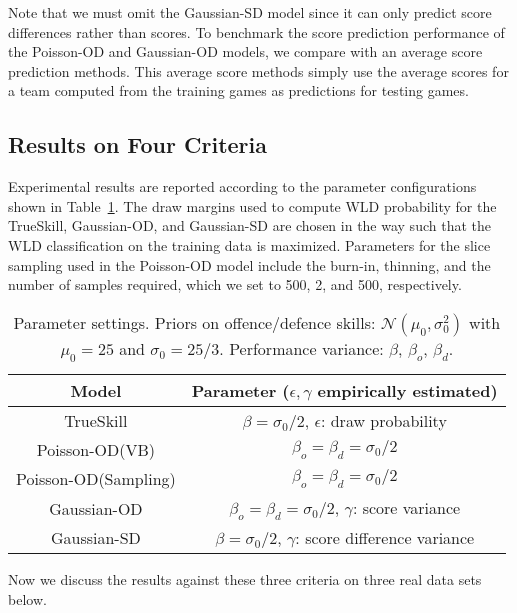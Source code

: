 Note that we must omit the Gaussian-SD model since it can only predict score differences rather than scores. To benchmark the score prediction performance of the Poisson-OD and Gaussian-OD models, we compare with an average score prediction methods. This average score methods simply use the average scores for a team computed from the training games as predictions for testing games.

\subsection{Results on Four Criteria}
\label{sec:results}

Experimental results are reported according to the parameter configurations shown in Table~\ref{table:Parameters}. The draw margins used to compute WLD probability for the TrueSkill, Gaussian-OD, and Gaussian-SD are chosen in the way such that the WLD classification on the training data is maximized. Parameters for the slice sampling used in the Poisson-OD model include the burn-in, thinning, and the number of samples required, which we set to 500, 2, and 500, respectively. 
\begin{table}[htbp!]
\caption{Parameter settings. Priors on offence/defence skills: $\mathcal{N}(\mu_{0},\sigma_{0}^2)$ with $\mu_{0}=25$ and $\sigma_{0}=25/3$. Performance variance: $\beta$, $\beta_o$, $\beta_d$.}
\begin{center}
\small
\begin{tabular}{cc}
  \hline
  Model             & Parameter ($\epsilon,\gamma$ empirically estimated)\\
  \hline
  TrueSkill          & $\beta=\sigma_{0}/2$, $\epsilon$: draw probability\\
  Poisson-OD(VB)         & $\beta_o=\beta_d=\sigma_{0}/2$\\
  Poisson-OD(Sampling)         & $\beta_o=\beta_d=\sigma_{0}/2$\\
  Gaussian-OD    & $\beta_o=\beta_d=\sigma_{0}/2$, $\gamma$: score variance\\
  Gaussian-SD & $\beta=\sigma_{0}/2$, $\gamma$: score difference variance\\
  \hline
\end{tabular}
\label{table:Parameters}
\end{center}
\end{table}
Now we discuss the results against these three criteria on three real data sets below. 

